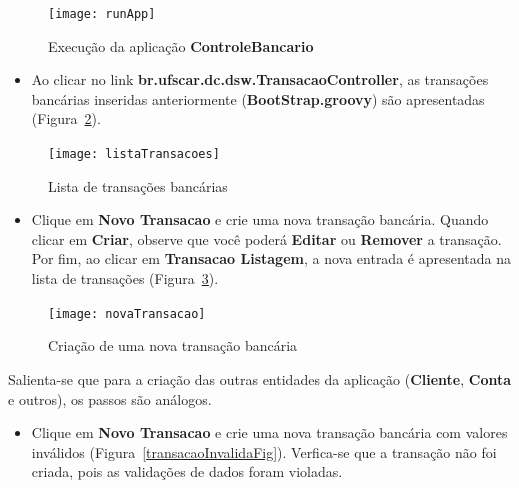 \begin{figure}[htbp]
\centering\texttt{[image: runApp]}
\caption{Execução da aplicação {\bf ControleBancario}}
\label{executarFig}
\end{figure}

\vspace{0.3cm}

\begin{itemize}

\item   Ao  clicar  no   link  {\bf   br.ufscar.dc.dsw.TransacaoController},  as
  transações  bancárias  inseridas  anteriormente ({\bf  BootStrap.groovy})  são
  apresentadas (Figura~\ref{listaTransacoesFig}). 

\end{itemize}

\vspace{0.5cm}

\begin{figure}[htbp]
\centering\texttt{[image: listaTransacoes]}
\caption{Lista de transações bancárias}
\label{listaTransacoesFig}
\end{figure}

\vspace{0.5cm}

\begin{itemize}

\item Clique em {\bf Novo Transacao}  e crie uma nova transação bancária. Quando
  clicar em {\bf Criar}, observe que você poderá {\bf Editar} ou {\bf Remover} a
  transação. Por  fim, ao clicar em  {\bf Transacao Listagem}, a  nova entrada é
  apresentada na lista de transações (Figura~\ref{novaTransacaoFig}). 

\end{itemize}

\vspace{1cm}

\begin{figure}[htbp]
\centering\texttt{[image: novaTransacao]}
\caption{Criação de uma nova transação bancária}
\label{novaTransacaoFig}
\end{figure}

\vspace{0.5cm}

Salienta-se que para a criação das outras entidades da aplicação ({\bf Cliente},
{\bf Conta} e outros), os passos são análogos.  

\newpage

\begin{itemize}

\item Clique  em {\bf  Novo Transacao}  e crie uma  nova transação  bancária com
  valores  inválidos   (Figura~\ref{transacaoInvalidaFig}).   Verfica-se  que  a
  transação não foi criada, pois as validações de dados foram violadas. 

\end{itemize}

